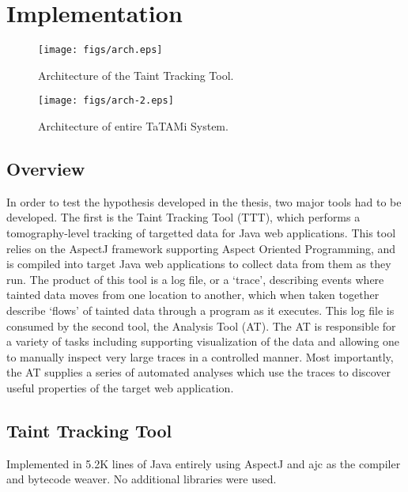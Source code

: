 \documentclass[msc,oneside]{ubcthesis}
\begin{document}
\chapter{Implementation}

\begin{figure}[ht]
  \begin{center}
    \texttt{[image: figs/arch.eps]}
    \caption[Architecture of the Taint Tracking Tool.]{\label{fig:arch} Architecture of the Taint Tracking Tool.}
  \end{center}
\end{figure}

\begin{figure}[ht]
  \begin{center}
    \texttt{[image: figs/arch-2.eps]}
    \caption[Architecture of entire TaTAMi System.]{\label{fig:arch-2} Architecture of entire TaTAMi System.}
  \end{center}
\end{figure}

\section{Overview}
In order to test the hypothesis developed in the thesis, two major tools had to be developed. The first is the Taint Tracking Tool (TTT), which performs a tomography-level tracking of targetted data for Java web applications. This tool relies on the AspectJ framework supporting Aspect Oriented Programming, and is compiled into target Java web applications to collect data from them as they run. The product of this tool is a log file, or a `trace', describing events where tainted data moves from one location to another, which when taken together describe `flows' of tainted data through a program as it executes. This log file is consumed by the second tool, the Analysis Tool (AT). The AT is responsible for a variety of tasks including supporting visualization of the data and allowing one to manually inspect very large traces in a controlled manner. Most importantly, the AT supplies a series of automated analyses which use the traces to discover useful properties of the target web application.

\section{Taint Tracking Tool}
Implemented in 5.2K lines of Java entirely using AspectJ and ajc as the compiler and bytecode weaver. No additional libraries were used.
\end{document}
